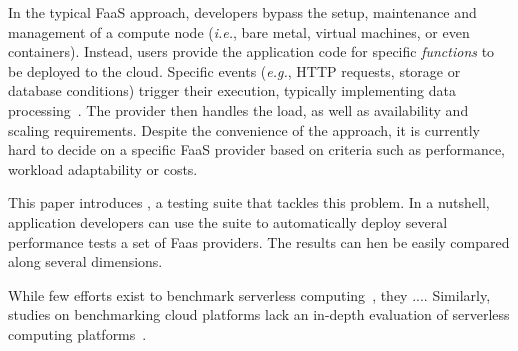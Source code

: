 In the typical FaaS approach, developers bypass the setup, maintenance and management of a compute node (\emph{i.e.}, bare metal, virtual machines, or even containers). %
Instead, users provide the application code for specific \emph{functions} to be deployed to the cloud.
Specific events (\emph{e.g.}, \gls{HTTP} requests, storage or database conditions) trigger their execution, typically implementing data processing~\cite{AWSLambda, GoogleFunctions}.
The provider then handles the load, as well as availability and scaling requirements. %
Despite the convenience of the approach, it is currently hard to decide on a specific FaaS provider based on criteria such as performance, workload adaptability or costs.

This paper introduces \sys, a testing suite that tackles this problem.
In a nutshell, application developers can use the \sys suite to automatically deploy several performance tests a set of Faas providers. 
The results can hen be easily compared along several dimensions.

While few efforts exist to benchmark serverless computing~\cite{doi:10.1002/cpe.4792, Kuntsevich:2018:DAB:3284014.3284016, EoPSCE, 10.1007/978-3-319-75178-8_34}, they .... 
Similarly, studies on benchmarking cloud platforms lack an in-depth evaluation of serverless computing platforms~\cite{Gan:2019:OBS:3297858.3304013}. 


 
